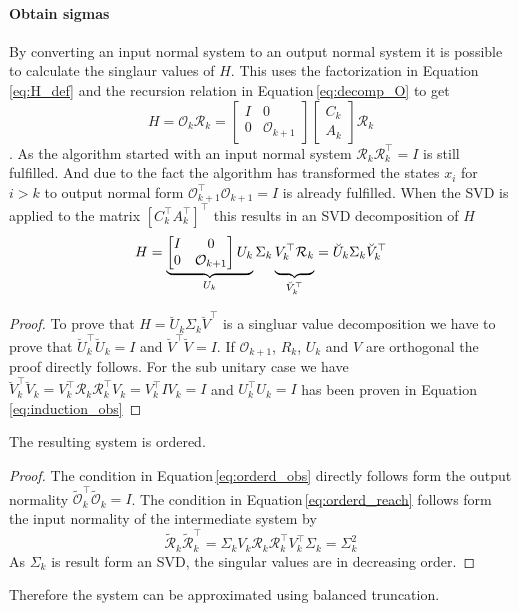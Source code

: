\documentclass[doctype=mastersthesis,BCOR=15mm,biblatex]{ldvbook}%
\newcommand{\R}{\mathcal{R}} %
\newcommand{\Ob}{\mathcal{O}} %
\newcommand{\eye}{I} %
\begin{document}
\begin{itemize}
\paragraph{Obtain sigmas}
By converting an input normal system to an output normal system it is possible to calculate the singlaur values of $H$.
This uses the factorization in Equation\,\ref{eq:H_def} and the recursion relation in Equation\,\ref{eq:decomp_O}
to get
 \begin{equation}
 H = \Ob_k \R_k = 
 \begin{bmatrix}
 \eye& 0 \\
 0& \Ob_{k+1}
 \end{bmatrix}
 \begin{bmatrix}
 C_k\\
 A_k
 \end{bmatrix}
 \R_k
 \end{equation}.
As the algorithm started with an input normal system $\R_k\R_k^\top = \eye$ is still fulfilled.
And due to the fact the algorithm has transformed the states $x_i$ for $i>k$ to output normal form $\Ob_{k+1}^\top \Ob_{k+1} = \eye$ is already fulfilled.
When the SVD is applied to the matrix $[C_k^\top A_k^\top]^\top$ this results in an SVD decomposition of $H$
 \begin{equation}
 H = 
 \underbrace{
 	\begin{bmatrix}
 	\eye& 0 \\
 	0& \Ob_{k+1}
 	\end{bmatrix}
 	U_k}_{U_k} 
 \Sigma_k 
 \underbrace{\vphantom{\begin{matrix} 0 \\0\end{matrix}}
 	V_k^\top
 	\R_k}_{\breve{V}_k^\top}
 =\breve{U}_k\Sigma_k \breve{V}_k^\top
 \end{equation}

 \begin{proof}
 	To prove that $H = \breve{U}_k\Sigma_k\breve{V}^\top$ is a singluar value decomposition we have to prove that $\breve{U}_k^\top \breve{U}_k= \eye$ and $\breve{V}^\top \breve{V} = \eye$.
 	If $\Ob_{k+1}$, $R_k$, $U_k$ and $V$ are orthogonal the proof directly follows. For the sub unitary case we have 
 	$
 	\breve{V}_k^\top \breve{V}_k
 	=
 	V_k^\top
 	\R_k
 	\R_k^\top
 	V_k
 	=
 	V_k^\top
 	\eye
 	V_k
 	=
 	\eye
 	$
 	and
 	$
 	U_k^\top U_k
 	=
 	\eye 
 	$
 	has been proven in Equation\,\ref{eq:induction_obs}
 \end{proof}

The resulting system is ordered.
\begin{proof}
	The condition in Equation\,\ref{eq:orderd_obs} directly follows form the output normality $\tilde{\Ob}_k^\top \tilde{\Ob}_k = \eye$.
	The condition in Equation\,\ref{eq:orderd_reach} follows form the input normality of the intermediate system by
	\begin{equation}
		\tilde{\R}_k \tilde{\R}_k^\top 
		=
		\Sigma_k V_k \R_k \R_k^\top V_k^\top \Sigma_k 
		= \Sigma_k^2
	\end{equation}
	As $\Sigma_k$ is result form an SVD, the singular values are in decreasing order. 
\end{proof}
Therefore the system can be approximated using balanced truncation.


\end{itemize}
\end{document}
